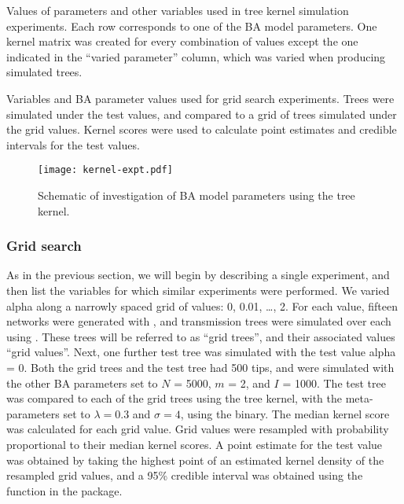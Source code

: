 \begin{landscape}
\begin{table}[ht]
  \centering
  
  \caption[Variables used in tree kernel simulation experiments]
  {
    Values of parameters and other variables used in tree kernel simulation
    experiments. Each row corresponds to one of the \gls{BA} model parameters.
    One kernel matrix was created for every combination of values except the
    one indicated in the ``varied parameter'' column, which was varied when
    producing simulated trees.
  }
  \label{tab:kernelexpt}
\end{table}

\begin{table}[ht]
  \centering
  
  \caption[Variables used in grid search experiments]
  {
    Variables and \gls{BA} parameter values used for grid search experiments. 
    Trees were simulated under the test values, and compared to a grid of trees
    simulated under the grid values. Kernel scores were used to calculate point
    estimates and credible intervals for the test values.
  }
  \label{tab:gridexpt}
\end{table}
\end{landscape}

\begin{figure}[ht]
  \centering
  \texttt{[image: kernel-expt.pdf]}
  \caption[Schematic of kernel classifier experiment]{
    Schematic of investigation of \gls{BA} model parameters using the tree
    kernel.
  }
  \label{fig:kernelexpt}
\end{figure}

\subsubsection*{Grid search}

As in the previous section, we will begin by describing a single experiment,
and then list the variables for which similar experiments were performed. We
varied \gls{alpha} along a narrowly spaced grid of values: 0, 0.01, \ldots, 2.
For each value, fifteen networks were generated with , and
transmission trees were simulated over each using . These
trees will be referred to as ``grid trees'', and their associated values ``grid
values''. Next, one further test tree was simulated with the test value
\gls{alpha} = 0. Both the grid trees and the test tree had 500 tips, and were
simulated with the other \gls{BA} parameters set to $N$ = 5000, $m$ = 2, and
$I$ = 1000. The test tree was compared to each of the grid trees using the tree
kernel, with the meta-parameters set to $\lambda = 0.3$ and $\sigma = 4$, using
the  binary. The median kernel score was calculated for
each grid value. Grid values were resampled with probability proportional to
their median kernel scores. A point estimate for the test value was obtained by
taking the highest point of an estimated kernel density of the resampled grid
values, and a 95\% credible interval was obtained using the
 function in the  package.


